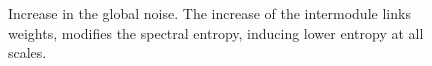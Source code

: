 \documentclass[a4paper]{article}
\begin{document}
\begin{figure}
\caption{Increase in the global noise. The increase of the intermodule links weights, modifies the spectral entropy, inducing lower entropy at all scales.}
\label{fig:benchmark_network}
\end{figure}
\end{document}
